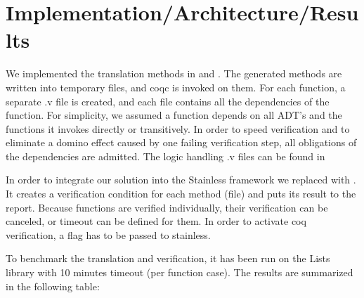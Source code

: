 \section{Implementation/Architecture/Results}

We implemented the translation methods in  and  . The generated methods are written into temporary files, and coqc is invoked on them. For each function, a separate .v file is created, and each file contains all the dependencies of the function. For simplicity, we assumed a function depends on all ADT's and the functions it invokes directly or transitively. In order to speed verification and to eliminate a domino effect caused by one failing verification step, all obligations of the dependencies are admitted. The logic handling .v files can be found in 

In order to integrate our solution into the Stainless framework we replaced  with . It creates a verification condition for each method (file) and puts its result to the report. Because functions are verified individually, their verification can be canceled, or timeout can be defined for them.
%
In order to activate coq verification, a  flag has to be passed to stainless.

To benchmark the translation and verification, it has been run on the Lists library with 10 minutes timeout (per function case). The results are summarized in the following table: